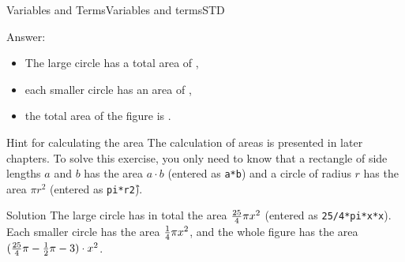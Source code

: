 \begin{MXContent}{Variables and Terms}{Variables and terms}{STD}
\begin{MExercise}
Answer:
\begin{itemize}
\item{The large circle has a total area of ,}
\item{each smaller circle has an area of ,}
\item{the total area of the figure is .}
\end{itemize}

\begin{MHint}{Hint for calculating the area}
The calculation of areas is presented in later chapters. To solve this exercise, you only need to know that
a rectangle of side lengths $a$ and $b$ has the area $a\cdot b$ (entered as \texttt{a*b}) and  
a circle of radius $r$ has the area $\pi r^2$ (entered as \texttt{pi*r\^2}).
\end{MHint}

\begin{MHint}{Solution}
The large circle has in total the area $\tfrac{25}{4}\pi x^2$ (entered as \texttt{25/4*pi*x*x}).
Each smaller circle has the area $\tfrac{1}{4}\pi x^2$, and the whole figure has the area 
$(\tfrac{25}{4}\pi-\tfrac{1}{2}\pi-3)\cdot x^2$.
\end{MHint}
\end{MExercise}

\end{MXContent}

